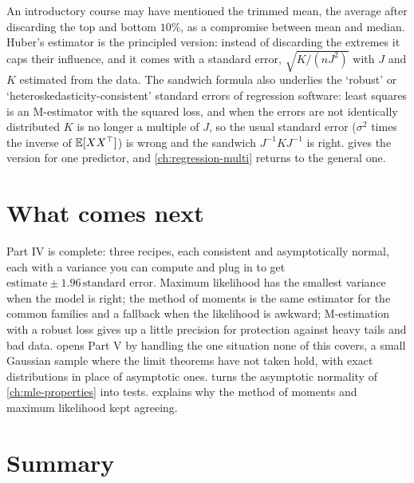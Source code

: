 \begin{bridge}
An introductory course may have mentioned the trimmed mean, the average after discarding the top and bottom $10\%$, as a compromise between mean and median.
Huber's estimator is the principled version: instead of discarding the extremes it caps their influence, and it comes with a standard error, $\sqrt{K/(nJ^2)}$ with $J$ and $K$ estimated from the data.
The sandwich formula also underlies the `robust' or `heteroskedasticity-consistent' standard errors of regression software: least squares is an M-estimator with the squared loss, and when the errors are not identically distributed $K$ is no longer a multiple of $J$, so the usual standard error ($\sigma^2$ times the inverse of $\operatorname*{\mathbb{E}}[XX^\top]$) is wrong and the sandwich $J^{-1}KJ^{-1}$ is right.
 gives the version for one predictor, and \cref{ch:regression-multi} returns to the general one.
\end{bridge}

\section{What comes next}
\label{sec:mom-next}

Part IV is complete: three recipes, each consistent and asymptotically normal, each with a variance you can compute and plug in to get $\text{estimate} \pm 1.96\,\text{standard error}$.
Maximum likelihood has the smallest variance when the model is right; the method of moments is the same estimator for the common families and a fallback when the likelihood is awkward; M-estimation with a robust loss gives up a little precision for protection against heavy tails and bad data.
 opens Part V by handling the one situation none of this covers, a small Gaussian sample where the limit theorems have not taken hold, with exact distributions in place of asymptotic ones.
 turns the asymptotic normality of \cref{ch:mle-properties} into tests.
 explains why the method of moments and maximum likelihood kept agreeing.

\section{Summary}
\label{sec:mom-summary}

